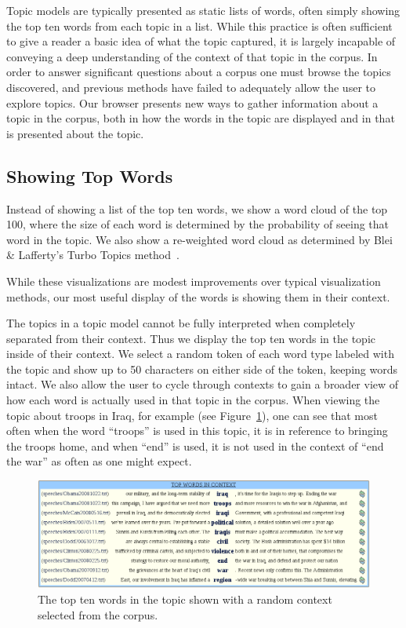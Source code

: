 \documentclass{article}
\begin{document}
Topic models are typically presented as static lists of words, often simply
showing the top ten words from each topic in a list.  While this practice is
often sufficient to give a reader a basic idea of what the topic captured, it
is largely incapable of conveying a deep understanding of the context of that
topic in the corpus.  In order to answer significant questions about a corpus
one must browse the topics discovered, and previous methods have failed to
adequately allow the user to explore topics.  Our browser presents new ways
to gather information about a topic in the corpus, both in how the words in the
topic are displayed and in that is presented about the topic.

\subsection{Showing Top Words}

Instead of showing a list of the top ten words, we show a word cloud of the top
100, where the size of each word is determined by the probability of seeing
that word in the topic.  We also show a re-weighted word cloud as determined by
Blei \& Lafferty's Turbo Topics method~\cite{blei-2009-turbo-topics}.

While these visualizations are modest improvements over typical visualization
methods, our most useful display of the words is showing them in their context.

The topics in a topic model cannot be fully interpreted when completely
separated from their context.  Thus we display the top ten words in the topic
inside of their context.  We select a random token of each word type labeled
with the topic and show up to 50 characters on either side of the token,
keeping words intact.  We also allow the user to cycle through contexts to gain
a broader view of how each word is actually used in that topic in the corpus.
When viewing the topic about troops in Iraq, for example (see
Figure~\ref{fig:context}), one can see that most often when the word ``troops''
is used in this topic, it is in reference to bringing the troops home, and when
``end'' is used, it is not used in the context of ``end the war'' as often as
one might expect.

\begin{figure}
  \centering
  \includegraphics[width=.8\textwidth]{words_in_context}
  \caption{The top ten words in the topic shown with a random context selected
  from the corpus.}
  \label{fig:context}
\end{figure}
\end{document}
